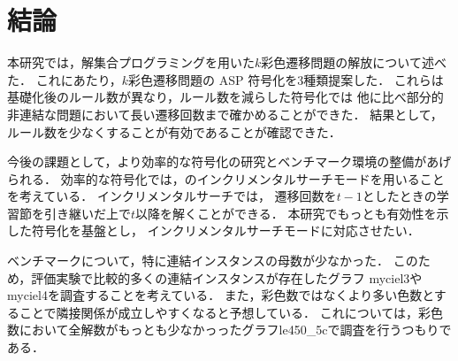 \chapter{結論} \label{chap:conclusion}
本研究では，解集合プログラミングを用いた$k$彩色遷移問題の解放について述べた．
これにあたり，$k$彩色遷移問題の ASP 符号化を3種類提案した．
これらは基礎化後のルール数が異なり，ルール数を減らした符号化では
他に比べ部分的非連結な問題において長い遷移回数まで確かめることができた．
結果として，ルール数を少なくすることが有効であることが確認できた．

今後の課題として，より効率的な符号化の研究とベンチマーク環境の整備があげられる．
効率的な符号化では，{\clingo}のインクリメンタルサーチモードを用いることを考えている．
インクリメンタルサーチでは，
遷移回数を$t-1$としたときの学習節を引き継いだ上で$t$以降を解くことができる．
本研究でもっとも有効性を示した符号化を基盤とし，
インクリメンタルサーチモードに対応させたい．

ベンチマークについて，特に連結インスタンスの母数が少なかった．
このため，評価実験で比較的多くの連結インスタンスが存在したグラフ
myciel3やmyciel4を調査することを考えている．
また，彩色数ではなくより多い色数とすることで隣接関係が成立しやすくなると予想している．
これについては，彩色数において全解数がもっとも少なかっったグラフle450\_5cで調査を行うつもりである．


